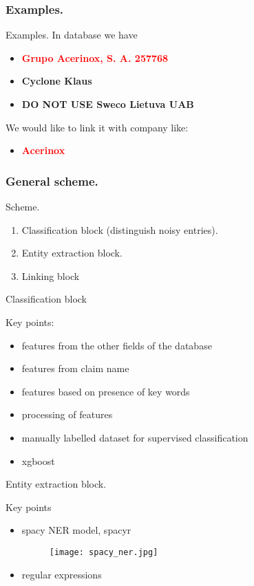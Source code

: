 \documentclass{beamer}
\begin{document}
\begin{frame}
\frametitle{Examples.}
\begin{block}{Examples.}
In database we have

\begin{itemize}
	\item \textcolor{red}{\textbf{Grupo Acerinox, S. A. 257768}}
	\item \textbf{Cyclone Klaus}
	\item \textbf{DO NOT USE Sweco Lietuva UAB}
\end{itemize}

We would like to link it with company like:

\begin{itemize}
\item
\textcolor{red}{\textbf{Acerinox}}
\end{itemize}
\end{block}
\end{frame}

\begin{frame}
\frametitle{General scheme.}
\begin{block}{Scheme.}
\begin{enumerate}
	\item Classification block (distinguish noisy entries).
	\item Entity extraction block.
	\item Linking block
\end{enumerate}
\end{block}
\end{frame}

\begin{frame}{Classification block}
\begin{block}{Key points:}
\begin{itemize}
	\item features from the other fields of the database
	\item features from claim name
	\item features based on presence of key words
	\item processing of features
	\item manually labelled dataset for supervised classification
	\item xgboost
\end{itemize}
\end{block}
\end{frame}

\begin{frame}{Entity extraction block.}
\begin{block}{Key points}
\begin{itemize}
\item spacy NER model, spacyr

\begin{figure}[h!]
\centering
\texttt{[image: spacy\_ner.jpg]}
\end{figure}

\item regular expressions
\end{itemize}
\end{block}
\end{frame}
\end{document}
